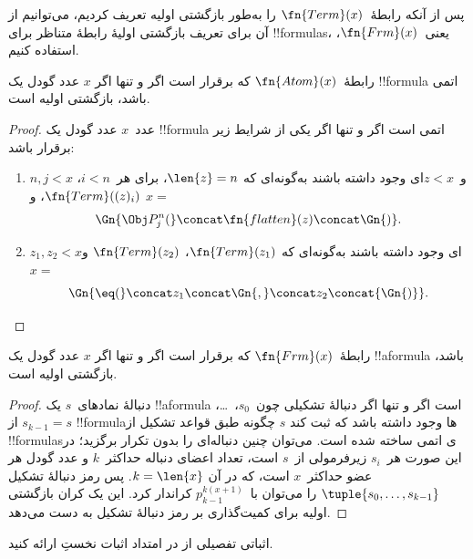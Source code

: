 \documentclass[../../../include/open-logic-section]{subfiles}
\begin{document}

پس از آنکه رابطهٔ~$\fn{Term}(x)$ را به‌طور بازگشتی اولیه تعریف کردیم،
می‌توانیم از آن برای تعریف بازگشتی اولیهٔ رابطهٔ متناظر برای
!!{formula}s، یعنی~$\fn{Frm}(x)$، استفاده کنیم.

\begin{prop}
رابطهٔ~$\fn{Atom}(x)$ که برقرار است اگر و تنها اگر $x$ عدد گودل یک
!!{formula} اتمی باشد، بازگشتی اولیه است.
\end{prop}

\begin{proof}
عدد~$x$ عدد گودل یک !!{formula} اتمی است اگر و تنها اگر یکی از شرایط
زیر برقرار باشد:
\begin{enumerate}
\item $n,j<x$ و~$z<x$ای وجود داشته باشند به‌گونه‌ای که
  $\len{z}=n$، برای هر~$i<n$، $\fn{Term}((z)_i)$، و $x=$
\[
\Gn{\Obj P^n_j(} \concat \fn{flatten}(z) \concat \Gn{)}.
\]
\item $z_1,z_2<x$ای وجود داشته باشند به‌گونه‌ای که
  $\fn{Term}(z_1)$، $\fn{Term}(z_2)$ و $x=$
\[
\Gn{{\eq}(} \concat z_1 \concat \Gn{,} \concat z_2 \concat{\Gn{)}}.
\]
\end{enumerate}
\end{proof}

\begin{prop}
رابطهٔ~$\fn{Frm}(x)$ که برقرار است اگر و تنها اگر $x$ عدد گودل یک
!!a{formula} باشد، بازگشتی اولیه است.
\end{prop}

\begin{proof}
دنبالهٔ نمادهای~$s$ یک !!a{formula} است اگر و تنها اگر دنبالهٔ تشکیلی
چون~$s_0$،~\dots، $s_{k-1}=s$ از !!{formula}ها وجود داشته باشد که ثبت
کند $s$ چگونه طبق قواعد تشکیل از !!{formula}sی اتمی ساخته شده است.
می‌توان چنین دنباله‌ای را بدون تکرار برگزید؛ در این صورت هر~$s_i$
زیرفرمولی از~$s$ است، تعداد اعضای دنباله حداکثر~$k$ و عدد گودل
هر عضو حداکثر~$x$ است، که در آن $k=\len{x}$. پس رمز دنبالهٔ تشکیل
$\tuple{s_0,\dots,s_{k-1}}$ را می‌توان با~$p_{k-1}^{k(x+1)}$
کراندار کرد. این یک کران بازگشتی اولیه
برای کمیت‌گذاری بر رمز دنبالهٔ تشکیل به دست می‌دهد.
\end{proof}

\begin{prob}
اثباتی تفصیلی از  در امتداد
اثبات نخستِ  ارائه کنید.
\end{prob}
\end{document}
